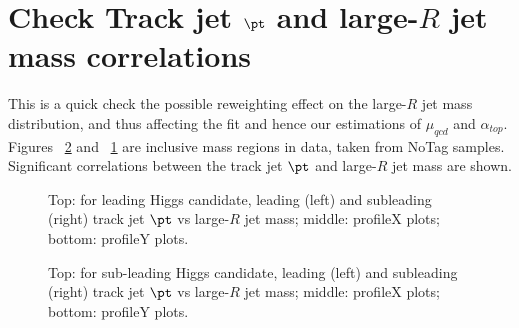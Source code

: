 \section{Check Track jet $\pt$ and large-$R$ jet mass correlations}
\label{app:check-trkptjm}

This is a quick check the possible reweighting effect on the large-$R$ jet mass distribution, and thus affecting the fit and hence our estimations of $\mu_{qcd}$ and $\alpha_{top}$. Figures ~\ref{fig:app-check-subl-trkptjm} and ~\ref{fig:app-check-lead-trkptjm} are inclusive mass regions in data, taken from NoTag samples. Significant correlations between the track jet $\pt$ and large-$R$ jet mass are shown.

\begin{figure*}[htbp!]
\begin{center}
  \caption{Top: for leading Higgs candidate, leading (left) and subleading (right) track jet $\pt$ vs large-$R$ jet mass; middle: profileX plots; bottom: profileY plots. }
\label{fig:app-check-lead-trkptjm}
\end{center}
\end{figure*}


\begin{figure*}[htbp!]
\begin{center}
  \caption{Top: for sub-leading Higgs candidate, leading (left) and subleading (right) track jet $\pt$ vs large-$R$ jet mass; middle: profileX plots; bottom: profileY plots. }
\label{fig:app-check-subl-trkptjm}
\end{center}
\end{figure*}
